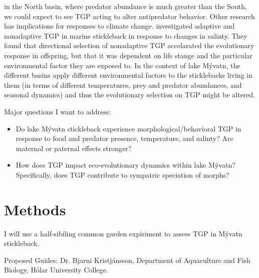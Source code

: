 \documentclass[12pt]{extarticle}
\begin{document}
in the North basin, where predator abundance is much greater than the South, we could expect to see TGP acting to alter antipredator behavior. Other research has implications for responses to climate change. \citet{Heckwolf2018} investigated adaptive and nonadaptive TGP in marine stickleback in response to changes in salinty. They found that directional selection of nonadaptive TGP accelarated the evolutionary response in offspring, but that it was dependent on life stange and the particular environmental factor they are exposed to. In the context of lake M\'yvatn, the different basins apply different environmental factors to the sticklebacks living in them (in terms of different temperatures, prey and predator abundances, and seasonal dynamics) and thus the evolutionary selection on TGP might be altered.   

Major questions I want to address:
\begin{itemize}
 \item Do lake M\'yvatn stickleback experience morphological/behavioral TGP in response to food and predator presence, temperature, and salinty? Are maternal or paternal effects stronger?
 \item How does TGP impact eco-evolutionary dynamics within lake M\'yvatn? Specifically, does TGP contribute to sympatric speciation of morphs?
\end{itemize}


\section{Methods}
I will use a half-sibiling common garden expiriment to assess TGP in M\'yvatn stickleback.

Proposed Guides: Dr. Bjarni Kristj\'ansson, Department of Aquaculture and Fish Biology, H\'olar University College.

\end{document}
